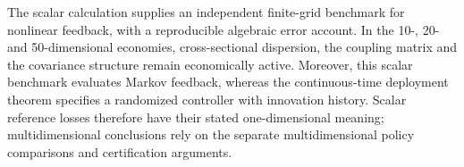 The scalar calculation supplies an independent finite-grid benchmark for
nonlinear feedback, with a reproducible algebraic error account. In the
10-, 20- and 50-dimensional economies, cross-sectional dispersion, the
coupling matrix and the covariance structure remain economically active.
Moreover, this scalar benchmark evaluates Markov feedback, whereas the
continuous-time deployment theorem specifies a randomized controller with
innovation history. Scalar reference losses therefore have their stated
one-dimensional meaning; multidimensional conclusions rely on the separate
multidimensional policy comparisons and certification arguments.



